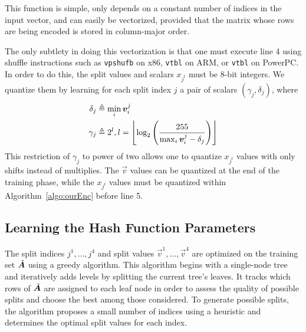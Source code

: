 This function is simple, only depends on a constant number of indices in the input vector, and can easily be vectorized, provided that the matrix whose rows are being encoded is stored in column-major order.

The only subtlety in doing this vectorization is that one must execute line 4 using shuffle instructions such as \texttt{vpshufb} on x86, \texttt{vtbl} on ARM, or \texttt{vtbl} on PowerPC. In order to do this, the split values and scalars $x_{j^t}$ must be 8-bit integers. We quantize them by learning for each split index $j$ a pair of scalars $(\gamma_j, \delta_j)$, where
\begin{align}
    \delta_j &\triangleq \min_i \bm{v}^j_i \label{eq:offset} \\
    \gamma_j &\triangleq 2^l, l = \left \lfloor  \log_2 \left( \frac{255}{\max_i \bm{v}^j_i - \delta_j} \right) \label{eq:scale}  \right \rfloor
\end{align}
This restriction of $\gamma_j$ to power of two allows one to quantize $x_{j^t}$ values with only shifts instead of multiplies. The $\vec{v}$ values can be quantized at the end of the training phase, while the $x_{j^t}$ values must be quantized within Algorithm~\ref{algo:ourEnc} before line 5.%

\subsection{Learning the Hash Function Parameters}

The split indices ${j^1,\ldots,j^4}$ and split values $\vec{v}^1,\ldots,\vec{v}^4$ are optimized on the training set $\tilde{\bm{A}}$ using a greedy algorithm. This algorithm begins with a single-node tree and iteratively adds levels by splitting the current tree's leaves. It tracks which rows of $\tilde{\bm{A}}$ are assigned to each leaf node in order to assess the quality of possible splits and choose the best among those considered. To generate possible splits, the algorithm proposes a small number of indices using a heuristic and determines the optimal split values for each index.%

